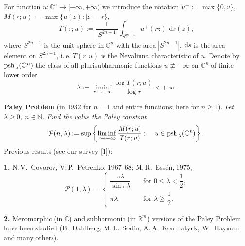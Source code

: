 





For function $u\colon {\mathbb C}^n\to [-\infty,+\infty)$ we introduce the notation  $u^+:=\max\{0, u\}$,
$M(r;u):=\max \bigl\{u(z)\colon |z|=r\bigr\}$,
\begin{equation*}
 T(r;u):=\frac{1}{|S^{2n-1}|}
\int_{S^{2n-1}} u^+ (rz)\, {\,\mathrm d} s(z),
\end{equation*}
where $S^{2n-1}$ is the unit sphere in  $\mathbb C^n$ with the area $|S^{2n-1}|$, ${\rm d}s$ is the area element on $S^{2n-1}$, i.\,e. $T(r,u)$ is the Nevalinna characteristic of $u$.
Denote by ${\rm psh\,}_{\lambda}(\mathbb C^n)$ the class of  all pluri\-sub\-ha\-r\-m\-o\-nic functions $u\not\equiv -\infty$ on $\mathbb C^n$ of finite  lower order
\begin{equation*}
 \lambda:=\liminf_{r\to +\infty}\frac{\log T(r;u)}{\log r}<+\infty .
\end{equation*}

\noindent
{\bf Paley Problem} (in 1932 for $n=1$ and entire functions; here for $n\geqslant 1$). {\it Let $\lambda \geqslant 0$, $n\in {\mathbb N}$.  Find the value the Paley constant
\begin{equation*}
\mathcal  P(n,\lambda):=\sup\left\{ \liminf_{r\to +\infty} \frac{M (r;u)}{T(r;u)}\, \colon \quad {u\in {\rm psh\,}_{\lambda}(\mathbb C^n)}\right\} .
\end{equation*}
}
Previous results (see our survey [1]):

\noindent
{\bf 1.} N.\,V.~Govorov, V.\,P.~Petrenko, 1967--68; M.\,R.~Ess\'en, 1975,
	\begin{equation*}
	\mathcal  P(1, \lambda)=\begin{cases}
	\dfrac{\pi \lambda}{\sin \pi \lambda} &\quad \text{for $0\leqslant \lambda <\dfrac{1}{2}$,}\\
	\pi \lambda &\quad \text{for $\lambda \geqslant \dfrac{1}{2}$.}
	\end{cases}
	\end{equation*}

\noindent
 {\bf 2.} Meromorphic (in ${\mathbb C}$) and subharmonic (in ${\mathbb R}^m$) versions of the Paley Problem have been studied (B.~Dahlberg, M.\,L.~Sodin,  A.\,A.~Kondratyuk, W.~Hayman and many others).

